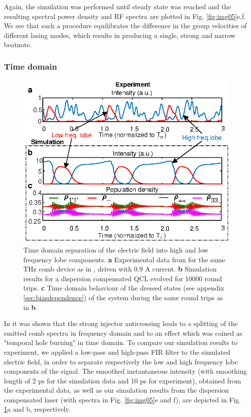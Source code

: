 \documentclass[10pt,letterpaper]{article}
\begin{document}
{Again, the simulation was performed until steady state was reached and the resulting spectral power density and RF spectra are plotted in Fig. \ref{fig:img05}e,f. We see that such a procedure equilibrates the difference in the group velocities of different lasing modes, which results in producing a single, strong and narrow beatnote. 

\subsubsection{Time domain}
\label{sec:timedomain}

\begin{figure}[h!]
	\begin{center}
		\includegraphics[scale=1]{figs/TEMPHOLEBURNING_EXPERIMENT.eps}
		\caption{ Time domain separation of the electric field into high and low frequency lobe components. \textbf{a} Experimental data from \cite{burghoff2015evaluating} for the same THz comb device as in \cite{burghoff2014terahertz}, driven with 0.9 A current. \textbf{b} Simulation results for a dispersion compensated QCL evolved for 10000 round trips. \textbf{c} Time domain behaviour of the dressed states (see appendix \ref{sec:biasdependence}) of the system during the same round trips as in \textbf{b}.} \label{fig:img06}
	\end{center}	
\end{figure}	

In \cite{burghoff2015evaluating} it was shown that the strong injector anticrossing leads to a splitting of the emitted comb spectra in frequency domain and to an effect which was coined as "temporal hole burning" in time domain. To compare our simulation results to experiment, we applied a low-pass and high-pass FIR filter to the simulated electric field, in order to separate respectively the low and high frequency lobe components of the signal. The smoothed instantaneous intensity (with smoothing length of 2 ps for the simulation data and 10 ps for experiment), obtained from the experimental data, as well as our simulation results from the dispersion compensated laser (with spectra in Fig. \ref{fig:img05}e and f), are depicted in Fig. \ref{fig:img06}a and b, respectively. 

}
\end{document}
